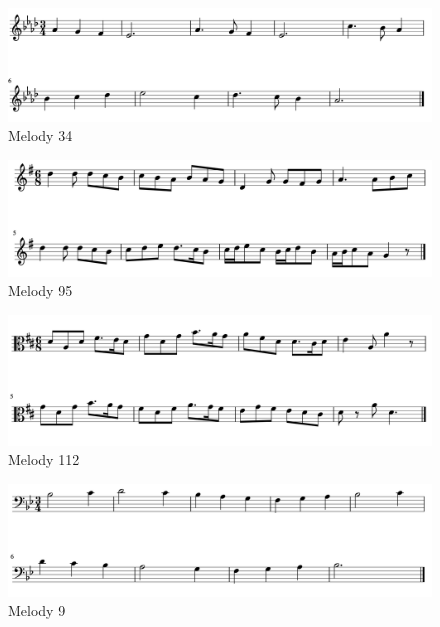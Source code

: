 \documentclass[12pt,]{book}
\begin{document}
\begin{figure}

{\centering \includegraphics[width=1\linewidth]{img/Berkowitz34} 

}

\caption{Melody 34}\label{fig:b34}
\end{figure}

\begin{figure}

{\centering \includegraphics[width=1\linewidth]{img/Berkowitz95} 

}

\caption{Melody 95}\label{fig:b95}
\end{figure}

\begin{figure}

{\centering \includegraphics[width=1\linewidth]{img/Berkowitz112} 

}

\caption{Melody 112}\label{fig:b112}
\end{figure}

\begin{figure}

{\centering \includegraphics[width=1\linewidth]{img/BerkowitzNo9} 

}

\caption{Melody 9}\label{fig:b9}
\end{figure}
\end{document}
